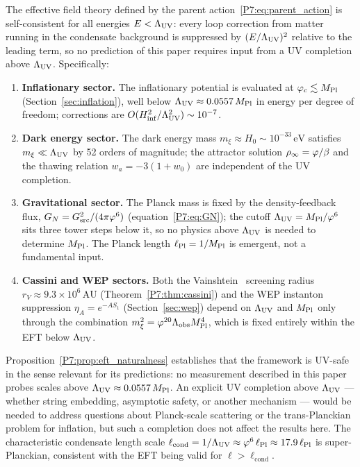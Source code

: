 \begin{proposition}
\label{P7:prop:eft_naturalness}
The effective field theory defined by the parent action~\eqref{P7:eq:parent_action}
is self-consistent for all energies $E < \Lambda_{\mathrm{UV}}$: every loop correction
from matter running in the condensate background is suppressed by
$(E/\Lambda_{\mathrm{UV}})^2$ relative to the leading term, so no prediction of this
paper requires input from a UV completion above $\Lambda_{\mathrm{UV}}$.
Specifically:
\begin{enumerate}[noitemsep,label=\emph{(\roman*)}]
\item \textbf{Inflationary sector.} The inflationary potential is
  evaluated at $\varphi_c\lesssim M_{\mathrm{Pl}}$ (Section~\ref{sec:inflation}),
  well below $\Lambda_{\mathrm{UV}}\approx0.0557\,M_{\mathrm{Pl}}$ in energy per degree of freedom;
  corrections are $O(H_{\mathrm{inf}}^2/\Lambda_{\mathrm{UV}}^2)\sim10^{-7}$.
\item \textbf{Dark energy sector.} The dark energy mass
  $m_\xi\approx H_0\sim10^{-33}\,\mathrm{eV}$ satisfies
  $m_\xi\ll\Lambda_{\mathrm{UV}}$ by 52 orders of magnitude; the attractor
  solution $\rho_{\infty}=\varphi/\beta$ and the thawing relation
  $w_a=-3(1+w_0)$ are independent of the UV completion.
\item \textbf{Gravitational sector.} The Planck mass is fixed by the
  density-feedback flux, $G_N=G_{\mathrm{src}}^2/(4\pi\varphi^6)$
  (equation~\eqref{P7:eq:GN}); the cutoff $\Lambda_{\mathrm{UV}}=M_{\mathrm{Pl}}/\varphi^6$ sits three
  tower steps below it, so no physics above $\Lambda_{\mathrm{UV}}$ is needed to
  determine $M_{\mathrm{Pl}}$. The Planck length $\ell_{\mathrm{Pl}}=1/M_{\mathrm{Pl}}$ is
  emergent, not a fundamental input.
\item \textbf{Cassini and WEP sectors.} Both the Vainshtein~\cite{Vainshtein1972} screening
  radius $r_V\approx9.3\times10^6\,\mathrm{AU}$ (Theorem~\ref{P7:thm:cassini})
  and the WEP instanton suppression $\eta_A=e^{-AS_1}$
  (Section~\ref{sec:wep}) depend on $\Lambda_{\mathrm{UV}}$ and $M_{\mathrm{Pl}}$ only through
  the combination $m_\xi^2=\varphi^{20}\Lambda_{\mathrm{obs}}M_{\mathrm{Pl}}^4$, which is
  fixed entirely within the EFT below $\Lambda_{\mathrm{UV}}$.
\end{enumerate}
\end{proposition}

\begin{remark}
\label{P7:rem:uv_completion_status}
Proposition~\ref{P7:prop:eft_naturalness} establishes that the framework
is UV-safe in the sense relevant for its predictions: no measurement
described in this paper probes scales above $\Lambda_{\mathrm{UV}}\approx0.0557\,M_{\mathrm{Pl}}$.
An explicit UV completion above $\Lambda_{\mathrm{UV}}$ --- whether string embedding,
asymptotic safety, or another mechanism --- would be needed to address
questions about Planck-scale scattering or the trans-Planckian problem
for inflation, but such a completion does not affect the results here.
The characteristic condensate length scale $\ell_\mathrm{cond}=1/\Lambda_{\mathrm{UV}}
\approx\varphi^6\,\ell_{\mathrm{Pl}}\approx17.9\,\ell_{\mathrm{Pl}}$
is super-Planckian, consistent with the EFT being valid for
$\ell>\ell_\mathrm{cond}$.
\end{remark}

